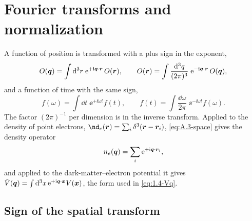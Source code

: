 \section{Fourier transforms and normalization}\label{app:A.3}

A function of position is transformed with a plus sign in the exponent,
\begin{equation}
  O(\bm{q}) = \int\mathrm{d}^3r\;\mathrm{e}^{+\mathrm{i}\bm{q}\cdot\bm{r}}\,O(\bm{r}), \qquad
  O(\bm{r}) = \int\frac{\mathrm{d}^3q}{(2\pi)^3}\;\mathrm{e}^{-\mathrm{i}\bm{q}\cdot\bm{r}}\,O(\bm{q}),
  \label{eq:A.3-space}
\end{equation}
and a function of time with the same sign,
\begin{equation}
  f(\omega) = \int\dd t\;\ee^{+\ii\omega t}f(t), \qquad
  f(t) = \int\frac{\dd\omega}{2\pi}\;\ee^{-\ii\omega t}f(\omega).
  \label{eq:A.3-time}
\end{equation}
The factor $(2\pi)^{-1}$ per dimension is in the inverse transform. Applied to the density of point electrons, $\nd_e(\vect{r}) = \sum_i\delta^3(\vect{r} - \vect{r}_i)$, \cref{eq:A.3-space} gives the density operator
\begin{equation}
  n_e(\bm{q}) = \sum_i \mathrm{e}^{+\mathrm{i}\bm{q}\cdot\bm{r}_i},
  \label{eq:A.3-ne}
\end{equation}
and applied to the dark-matter--electron potential it gives $\tilde V(\bm{q}) = \int\mathrm{d}^3x\,\mathrm{e}^{+\mathrm{i}\bm{q}\cdot\bm{x}}V(\bm{x})$, the form used in \cref{eq:1.4-Vq}.

\subsection{Sign of the spatial transform}

